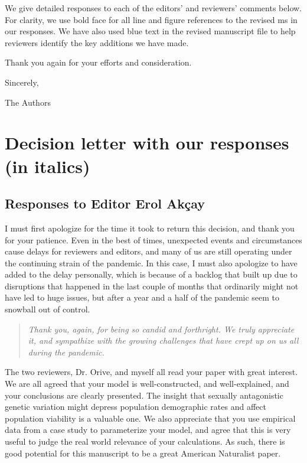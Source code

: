 \documentclass[11pt]{article}
\begin{document}
\noindent We give detailed responses to each of the editors' and reviewers' comments below. For clarity, we use bold face for all line and figure references to the revised ms in our responses. We have also used blue text in the revised manuscript file to help reviewers identify the key additions we have made.
\bigskip

\noindent Thank you again for your efforts and consideration.
\bigskip

\noindent Sincerely,

\noindent The Authors \\
\noindent\makebox[\linewidth]{\rule{\textwidth}{0.4pt}}
\smallskip


\section*{Decision letter with our responses (in italics)}

\subsection*{Responses to Editor Erol Ak\c{c}ay}


I must first apologize for the time it took to return this decision, and thank you for your patience. Even in the best of times, unexpected events and circumstances cause delays for reviewers and editors, and many of us are still operating under the continuing strain of the pandemic. In this case, I must also apologize to have added to the delay personally, which is because of a backlog that built up due to disruptions that happened in the last couple of months that ordinarily might not have led to huge issues, but after a year and a half of the pandemic seem to snowball out of control.

\begin{quote}
	{\itshape Thank you, again, for being so candid and forthright. We truly appreciate it, and sympathize with the growing challenges that have crept up on us all during the pandemic.}
\end{quote}


The two reviewers, Dr. Orive, and myself all read your paper with great interest. We are all agreed that your model is well-constructed, and well-explained, and your conclusions are clearly presented. The insight that sexually antagonistic genetic variation might depress population demographic rates and affect population viability is a valuable one. We also appreciate that you use empirical data from a case study to parameterize your model, and agree that this is very useful to judge the real world relevance of your calculations. As such, there is good potential for this manuscript to be a great American Naturalist paper.
\end{document}
